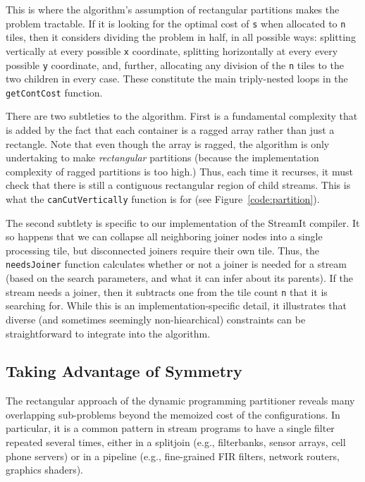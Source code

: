 This is where the algorithm's assumption of rectangular partitions
makes the problem tractable.  If it is looking for the optimal cost of
{\tt s} when allocated to {\tt n} tiles, then it considers dividing
the problem in half, in all possible ways: splitting vertically at
every possible {\tt x} coordinate, splitting horizontally at every
every possible {\tt y} coordinate, and, further, allocating any
division of the {\tt n} tiles to the two children in every case.
These constitute the main triply-nested loops in the {\tt getContCost}
function.

There are two subtleties to the algorithm.  First is a fundamental
complexity that is added by the fact that each container is a ragged
array rather than just a rectangle.  Note that even though the array
is ragged, the algorithm is only undertaking to make {\it rectangular}
partitions (because the implementation complexity of ragged partitions
is too high.)  Thus, each time it recurses, it must check that there
is still a contiguous rectangular region of child streams.  This is
what the {\tt canCutVertically} function is for (see
Figure~\ref{code:partition}).

The second subtlety is specific to our implementation of the StreamIt
compiler.  It so happens that we can collapse all neighboring joiner
nodes into a single processing tile, but disconnected joiners require
their own tile.  Thus, the {\tt needsJoiner} function calculates
whether or not a joiner is needed for a stream (based on the search
parameters, and what it can infer about its parents).  If the stream
needs a joiner, then it subtracts one from the tile count {\tt n} that
it is searching for.  While this is an implementation-specific detail,
it illustrates that diverse (and sometimes seemingly non-hiearchical)
constraints can be straightforward to integrate into the algorithm.

\subsection{Taking Advantage of Symmetry}

The rectangular approach of the dynamic programming partitioner
reveals many overlapping sub-problems beyond the memoized cost of the
configurations.  In particular, it is a common pattern in stream
programs to have a single filter repeated several times, either in a
splitjoin (e.g., filterbanks, sensor arrays, cell phone servers) or in
a pipeline (e.g., fine-grained FIR filters, network routers, graphics
shaders).  

